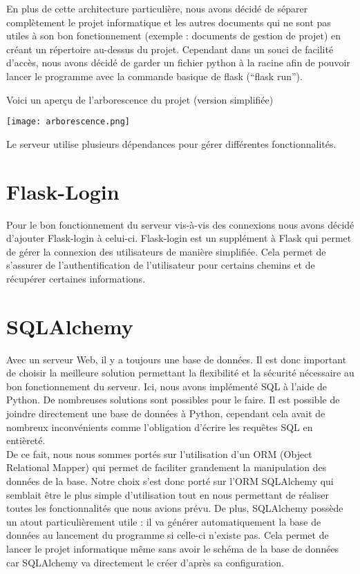 \documentclass[12pt,titlepage]{report}
\begin{document}
En plus de cette architecture particulière, nous avons décidé de séparer complètement le projet informatique et les autres documents qui ne sont pas utiles à son bon fonctionnement  (exemple : documents de gestion de projet) en créant un répertoire au-dessus du projet. 
Cependant dans un souci de facilité d’accès, nous avons décidé de garder un fichier python à la racine afin de pouvoir lancer le programme avec la commande basique de flask (“flask run”).

Voici un aperçu de l'arborescence du projet (version simplifiée)
\begin{center}
     \texttt{[image: arborescence.png]} 
\end{center}

Le serveur utilise plusieurs dépendances pour gérer différentes fonctionnalités.

\section{Flask-Login}

Pour le bon fonctionnement du serveur vis-à-vis des connexions nous avons décidé d'ajouter Flask-login à celui-ci. Flask-login est un supplément à Flask qui permet de gérer la connexion des utilisateurs de manière simplifiée. Cela permet de s’assurer de l’authentification de l’utilisateur pour certains chemins et de récupérer certaines informations.

\section{SQLAlchemy}

Avec un serveur Web, il y a toujours une base de données. Il est donc important de choisir la meilleure solution permettant la flexibilité et la sécurité nécessaire au bon fonctionnement du serveur. Ici, nous avons implémenté SQL à l'aide de Python. De nombreuses solutions sont possibles pour le faire. Il est possible de joindre directement une base de données à Python, cependant cela avait de nombreux inconvénients comme l’obligation d’écrire les requêtes SQL en entièreté. \\ 

De ce fait, nous nous sommes portés sur l’utilisation d’un ORM (Object Relational Mapper) qui permet de faciliter grandement la manipulation des données de la base. Notre choix s’est donc porté sur l'ORM SQLAlchemy qui semblait être le plus simple d’utilisation tout en nous permettant de réaliser toutes les fonctionnalités que nous avions prévu. De plus, SQLAlchemy possède un atout particulièrement utile : il va générer automatiquement la base de données au lancement du programme si celle-ci n’existe pas. Cela permet de lancer le projet informatique même sans avoir le schéma de la base de données car SQLAlchemy va directement le créer d’après sa configuration.
\end{document}

